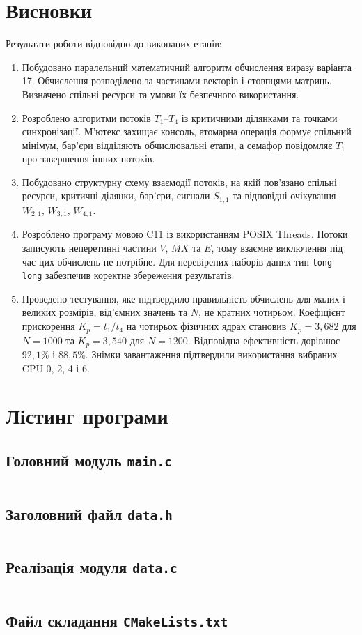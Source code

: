 \documentclass[12pt,a4paper]{article}
\begin{document}
\clearpage
\section{Висновки}

Результати роботи відповідно до виконаних етапів:
\begin{enumerate}[leftmargin=*,itemsep=0.5em]
\item Побудовано паралельний математичний алгоритм обчислення виразу
варіанта 17. Обчислення розподілено за частинами векторів і стовпцями
матриць. Визначено спільні ресурси та умови їх безпечного використання.

\item Розроблено алгоритми потоків $T_1$--$T_4$ із критичними ділянками
та точками синхронізації. М’ютекс захищає консоль, атомарна операція
формує спільний мінімум, бар’єри відділяють обчислювальні етапи, а
семафор повідомляє $T_1$ про завершення інших потоків.

\item Побудовано структурну схему взаємодії потоків, на якій пов’язано
спільні ресурси, критичні ділянки, бар’єри, сигнали $S_{1,1}$ та
відповідні очікування $W_{2,1}$, $W_{3,1}$, $W_{4,1}$.

\item Розроблено програму мовою C11 із використанням POSIX Threads.
Потоки записують неперетинні частини $V$, $MX$ та $E$, тому взаємне
виключення під час цих обчислень не потрібне. Для перевірених наборів
даних тип \texttt{long long} забезпечив коректне збереження результатів.

\item Проведено тестування, яке підтвердило правильність обчислень для
малих і великих розмірів, від’ємних значень та $N$, не кратних чотирьом.
Коефіцієнт прискорення $K_p=t_1/t_4$ на чотирьох фізичних ядрах становив
$K_p=3{,}682$ для $N=1000$ та $K_p=3{,}540$ для $N=1200$. Відповідна
ефективність дорівнює $92{,}1\%$ і $88{,}5\%$. Знімки завантаження
підтвердили використання вибраних CPU 0, 2, 4 і 6.
\end{enumerate}

\clearpage
\appendix
\section{Лістинг програми}

\subsection{Головний модуль \texttt{main.c}}
\inputminted{c}{../src/main.c}

\subsection{Заголовний файл \texttt{data.h}}
\inputminted{c}{../src/include/data.h}

\subsection{Реалізація модуля \texttt{data.c}}
\inputminted{c}{../src/include/data.c}

\subsection{Файл складання \texttt{CMakeLists.txt}}
\inputminted{cmake}{../src/CMakeLists.txt}
\end{document}
